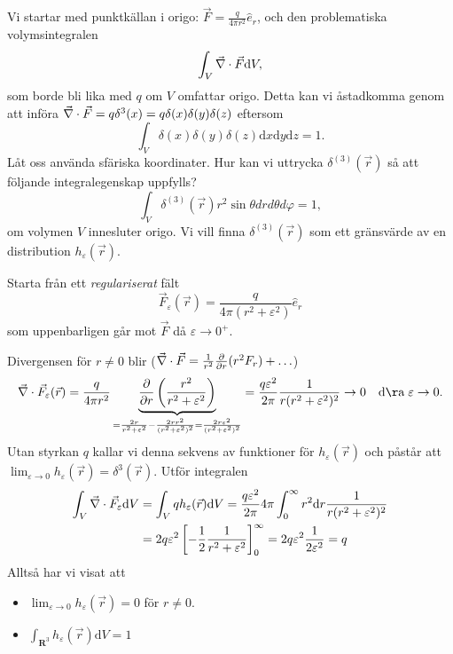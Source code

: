 \documentclass[%
oneside,                 %
final,                   %
10pt]{article}
\begin{document}
Vi startar med punktkällan i origo: $\vec{F} = \frac{q}{4 \pi r^2} \hat{e}_r$, och den problematiska volymsintegralen
$$
\int_V \vec{\nabla} \cdot \vec{F} \mbox{d}V,
$$
som borde bli lika med $q$ om $V$ omfattar origo. Detta kan vi åstadkomma genom att införa $\vec{\nabla} \cdot \vec{F} = q \delta^3(x) = q \delta(x)\delta(y)\delta(z)$ eftersom
$$
\int_V \delta(x)\delta(y)\delta(z) \mbox{d}x \mbox{d}y \mbox{d}z = 1.
$$
Låt oss använda sfäriska koordinater. Hur kan vi uttrycka $\delta^{(3)}(\vec{r})$ så att följande integralegenskap uppfylls?
$$
\int_V \delta^{(3)}(\vec{r}) r^2 \sin\theta dr d\theta d\varphi = 1,
$$
om volymen $V$ innesluter origo. Vi vill finna $\delta^{(3)}(\vec{r})$ som ett gränsvärde av en distribution $h_\varepsilon(\vec{r})$.

Starta från ett \emph{regulariserat} fält
\begin{equation}
\vec{F}_\varepsilon(\vec{r}) = \frac{q}{4 \pi (r^2 + \varepsilon^2)} \hat{e}_r
\end{equation}
som uppenbarligen går mot $\vec{F}$ då $\varepsilon \to 0^+$.

Divergensen för $r \neq 0$ blir ($\vec{\nabla} \cdot \vec{F} = \frac{1}{r^2} \frac{\partial}{\partial r} (r^2 F_r) + \ldots$)
\begin{equation}
\vnabla \cdot \vec{F}_\varepsilon(\vec{r}) = \frac{q}{4 \pi r^2} \underbrace{\frac{\partial}{\partial r} \left( \frac{r^2}{r^2 + \varepsilon^2} \right)}_{=\frac{2r}{r^2 + \varepsilon^2} - \frac{2 r r^2}{(r^2 + \varepsilon^2)^2} = \frac{2 r \varepsilon^2}{(r^2 + \varepsilon^2)^2}}
= \frac{q \varepsilon^2}{2 \pi} \frac{1}{r(r^2 + \varepsilon^2)^2} \to 0 \quad \mathrm{då} \; \varepsilon \to 0.
\end{equation}
Utan styrkan $q$ kallar vi denna sekvens av funktioner för $h_\varepsilon(\vec{r})$ och påstår att $\lim_{\varepsilon \to 0} h_\varepsilon(\vec{r}) = \delta^3(\vec{r})$. Utför integralen
\begin{align}
\int_V \vec{\nabla} \cdot \vec{F}_\varepsilon \mbox{d} V &= \int_V q h_\varepsilon(\vec{r}) \mbox{d} V = \frac{ q \varepsilon^2}{2 \pi} 4\pi \int_0^\infty r^2 \mbox{d} r \frac{1}{r(r^2 + \varepsilon^2)^2} \\ 
&= 2 q \varepsilon^2 \left[ -\frac{1}{2} \frac{1}{r^2 + \varepsilon^2} \right]_0^\infty = 2 q \varepsilon^2 \frac{1}{2 \varepsilon^2} = q
\end{align}
Alltså har vi visat att
\begin{itemize}
\item $\lim_{\varepsilon \to 0} h_\varepsilon(\vec{r}) = 0$ för $r \neq 0$.

\item $\int_{\mathbf{R}^3} h_\varepsilon(\vec{r}) \mbox{d}V = 1$
\end{itemize}
\end{document}
